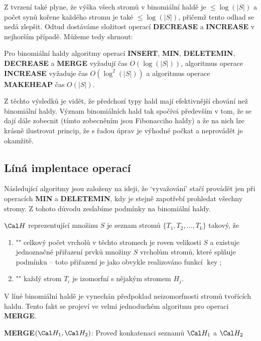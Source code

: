 \documentclass[a4paper,12pt]{article}
\def \emph#1{\underbar{#1}}
\DeclareMathOperator*{\key}{key}
\begin{document}
Z tvrzení také plyne, že výška všech stromů v 
binomiální haldě je $\le\log(|S|)$ a počet synů 
kořene každého stromu je 
také $\le\log(|S|)$, přičemž tento odhad se nedá zlepšit. Odtud 
dostáváme složitost operací {\bf DECREASE} a {\bf INCREASE} v nejhorším 
případě. Můžeme tedy shrnout:

\begin{veta}Pro binomiální haldy algoritmy operací 
{\bf IN\-SERT}, {\bf MIN}, {\bf DELETEMIN}, {\bf DECREASE} a {\bf MERGE  }
vy\-ža\-dují čas $O(\log(|S|))$, algoritmus operace {\bf INCRE\-ASE }
vy\-ža\-duje čas $O(\log^2(|S|))$ a algoritmus operace {\bf MAKEHEAP 
}čas $O(|S|)$.
\end{veta}

Z těchto výsledků je vidět, že předchozí 
typy hald mají efektivnější chování než binomiální haldy. 
Význam binomiálních hald tak spo\-čí\-vá především v 
tom, že se dají dále zobecnit (tímto zobecněním jsou Fibonacciho 
haldy) a že na nich lze krásně 
ilustrovat princip, že s řadou úprav je výhodné počkat 
a neprovádět je okamžitě.

\subsection{
Líná implentace operací
}

Následující algoritmy jsou založeny na ideji, že 
`vyvažování' stačí provádět jen při operacích {\bf MIN} a 
{\bf DELETEMIN}, kdy je stejně zapotřebí prohledat všechny 
stromy. Z tohoto důvodu zeslabíme podmínky na 
binomiální haldy.

\emph{Líná} \emph{binomiální} \emph{halda} $\Cal H$ 
reprezentující množinu $S$ je seznam stromů 
$\{T_1,T_2,\dots,T_k\}$ takový, že  
\begin{enumerate}
\item"{}"
celkový počet vrcholů v těchto stromech je 
roven velikosti $S$ a 
existuje jednoznačné přiřazení prvků množiny 
$S$ vrcholům stromů, které splňuje 
podmínku  -- toto přiřazení je jako obvykle 
realizováno funkcí $\key$;
\item"{}"
každý strom $T_i$ je izomorfní s nějakým stromem $H_
j$.
\end{enumerate}

V líné binomiální haldě je vynechán předpoklad 
neizo\-morf\-nosti stromů tvořících haldu. Tento fakt se 
projeví ve velmi jednoduchém algoritmu pro operaci 
{\bf MERGE}.

{\bf MERGE$(\Cal H_1,\Cal H_2)$}:\newline 
Prove\v d konkatenaci seznamů $\Cal H_1$ a $\Cal H_2$
\end{document}
